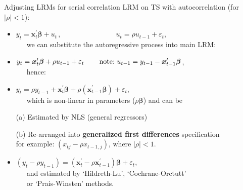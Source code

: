\documentclass{beamer}
\begin{document}
\begin{frame}{Adjusting LRMs for serial correlation}
LRM on TS with autocorrelation (for $|\rho|<1$):\\ \medskip
\begin{itemize}
    \item $y_t=\bm{x}_t^{\prime} \bm{\beta} + u_t \,,\qquad \qquad \qquad~~~~~~~\, u_t = \rho u_{t-1}+\varepsilon_t$,\\ \medskip
    ~~~we can substitute the autoregressive process into main LRM:\\ \bigskip
    \item $y_t=\bm{x}_t^{\prime} \bm{\beta} +\rho u_{t-1}+\varepsilon_t \, \qquad \textnormal{note:~} u_{t-1} = y_{t-1} - \bm{x}_{t-1}^{\prime} \bm{\beta} $, \\ \medskip ~~~hence: \\ \medskip
    \item $y_t= \rho y_{t-1} + \bm{x}_t^{\prime} \bm{\beta} + \rho (\bm{x}_{t-1}^{\prime} \bm{\beta}) + \varepsilon_t$, \\ \medskip 
    ~~~which is non-linear in parameters ($\rho \bm{\beta}$) and can be \\ \medskip
    \item[(a)] Estimated by NLS (general regressors)\\ \medskip
    \item[(b)] Re-arranged into \textbf{generalized first differences} specification \\
    for example: $(x_{tj}-\rho x_{t-1,j})$, where $|\rho|<1$.\\ \medskip
    \item $(y_t - \rho y_{t-1}) =  ( \bm{x}_t^{\prime} - \rho \bm{x}_{t-1}^{\prime}) \bm{\beta} + \varepsilon_t$,\\ \medskip
    ~~~and estimated by `Hildreth-Lu', `Cochrane-Orctutt' \\ 
    ~~~or `Prais-Winsten' methods.
\end{itemize}
\end{frame}
\end{document}

